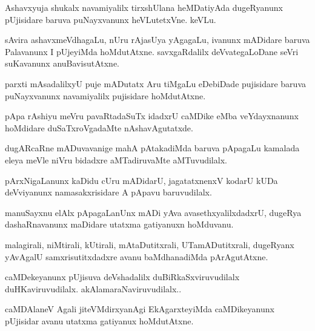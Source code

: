 \documentclass{article}
\begin{document}
\begin{mng}%
Ashavxyuja shukalx navamiyalilx tirxshUlana heMDatiyAda dugeRyanunx pUjisidare baruva puNayxvanunx 
heVLutetxVne. keVLu.
\end{mng}

\begin{mng}%
sAvira ashavxmeVdhagaLu, nUru rAjasUya yAgagaLu, ivanunx mADidare baruva Palavanunx I pUjeyiMda 
hoMdutAtxne. savxgaRdalilx deVvategaLoDane seVri suKavanunx anuBavisutAtxne.
\end{mng}

\begin{mng}%
parxti mAsadalilxyU puje mADutatx Aru tiMgaLu eDebiDade pujisidare baruva puNayxvanunx 
navamiyalilx pujisidare hoMdutAtxne.
\end{mng}

\begin{mng}%
pApa rAshiyu meVru pavaRtadaSuTx idadxrU caMDike eMba veYdayxnanunx hoMdidare duSaTxroVgadaMte 
nAshavAgutatxde.
\end{mng}

\begin{mng}%
dugARcaRne mADuvavanige mahA pAtakadiMda baruva pApagaLu kamalada eleya meVle niVru bidadxre 
aMTadiruvaMte aMTuvudilalx.
\end{mng}

\begin{mng}%
pArxNigaLanunx kaDidu cUru mADidarU, jagatatxnenxV kodarU kUDa deVviyanunx namasakxrisidare A 
pApavu baruvudilalx.
\end{mng}

\begin{mng}%
manuSayxnu elAlx pApagaLanUnx mADi yAva avasethxyalilxdadxrU, dugeRya dashaRnavanunx maDidare 
utatxma gatiyanuxn hoMduvanu.
\end{mng}

\begin{mng}%
malagirali, niMtirali, kUtirali, mAtaDutitxrali, UTamADutitxrali, dugeRyanx yAvAgalU 
samxrisutitxdadxre avanu baMdhanadiMda pArAgutAtxne.
\end{mng}

\begin{mng}%
caMDekeyanunx pUjisuva deVshadalilx duBiRkaSxviruvudilalx duHKaviruvudilalx. 
akAlamaraNaviruvudilalx..
\end{mng}

\begin{mng}%
caMDAlaneV Agali jiteVMdirxyanAgi EkAgarxteyiMda caMDikeyanunx pUjisidar avanu utatxma gatiyanux 
hoMdutAtxne.
\end{mng}
\end{document}
